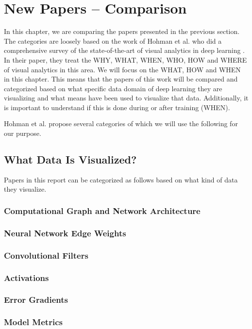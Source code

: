 \documentclass{acmsiggraph}               %
\begin{document}
\section{New Papers -- Comparison}
In this chapter, we are comparing the papers presented in the previous section. 
The categories are loosely based on the work of Hohman et al. who did a comprehensive survey of the state-of-the-art of visual analytics in deep learning \cite{Hohman2018}.
In their paper, they treat the WHY, WHAT, WHEN, WHO, HOW and WHERE of visual analytics in this area.
We will focus on the WHAT, HOW and WHEN in this chapter. This means that the papers of this work will be compared and categorized based on what specific data domain of deep learning they are visualizing and what means have been used to visualize that data. Additionally, it is important to understand if this is done during or after training (WHEN).

Hohman et al. propose several categories of which we will use the following for our purpose.

\subsection{What Data Is Visualized?}
Papers in this report can be categorized as follows based on what kind of data they visualize.
\subsubsection{Computational Graph and Network Architecture}
\subsubsection{Neural Network Edge Weights}
\subsubsection{Convolutional Filters}
\subsubsection{Activations}
\subsubsection{Error Gradients}
\subsubsection{Model Metrics}
\end{document}
